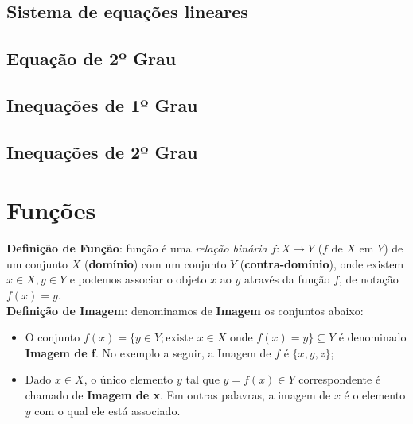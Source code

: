 \documentclass[13pt,letterpaper]{article}
\begin{document}
\subsection{Sistema de equações lineares}

\subsection{Equação de 2º Grau}

\subsection{Inequações de 1º Grau}

\subsection{Inequações de 2º Grau}
\newpage
\section{Funções}
\textbf{Definição de Função}: função é uma \emph{relação binária} $f: X \rightarrow Y$ ($f$ de $X$ em $Y$) de um conjunto $X$ (\textbf{domínio}) com um conjunto $Y$ (\textbf{contra-domínio}), onde existem $x \in X, y \in Y$ e podemos associar o objeto $x$ ao $y$ através da função $f$, de notação $f(x) = y$. \\
\textbf{Definição de Imagem}: denominamos de \textbf{Imagem} os conjuntos abaixo:
\begin{itemize}
    \item O conjunto $f(x) = \{y \in Y; \text{existe } x \in X \text{ onde } f(x) = y \} \subseteq Y$ é denominado \textbf{Imagem de f}. No exemplo a seguir, a Imagem de $f$ é $\{x, y, z \}$;
    \item Dado $x \in X$, o único elemento $y$ tal que $y = f(x) \in Y$ correspondente é chamado de \textbf{Imagem de x}. Em outras palavras, a imagem de $x$ é o elemento $y$ com o qual ele está associado. 
\end{itemize}
\end{document}
